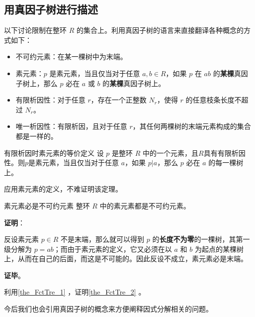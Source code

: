 

\subsection{用真因子树进行描述}

以下讨论限制在整环 $R$ 的集合上。利用真因子树的语言来直接翻译各种概念的方式如下：

\begin{definition}{}\label{def_FctTre_1}
\begin{itemize}
\item 不可约元素：在某一棵树中为末端。
\item 素元素：$p$ 是素元素，当且仅当对于任意 $a, b\in R$，如果 $p$ 在 $ab$ 的\textbf{某棵}真因子树上，那么 $p$ 必在 $a$ 或 $b$ 的\textbf{某棵}真因子树上。
\item 有限析因性：对于任意 $r$，存在一个正整数 $N_r$，使得 $r$ 的任意枝条长度不超过 $N_r$。
\item 唯一析因性：有限析因，且对于任意 $r$，其任何两棵树的末端元素构成的集合都是一样的。
\end{itemize}
\end{definition}

\begin{theorem}{有限析因时素元素的等价定义}\label{the_FctTre_1}
设 $p$ 是整环 $R$ 中的一个元素，且$R$具有有限析因性。则$p$是素元素，当且仅当对于任意 $a$，如果 $p|a$，那么 $p$ 必在 $a$ 的每一棵树上。
\end{theorem}

应用素元素的定义，不难证明该定理。


\begin{theorem}{素元素必是不可约元素}\label{the_FctTre_2}
整环 $R$ 中的素元素都是不可约元素。
\end{theorem}

\textbf{证明}：

反设素元素 $p\in R$ 不是末端，那么就可以得到 $p$ 的\textbf{长度不为零}的一棵树，其第一级分解为 $p=ab$；而由于素元素的定义，它又必须在以 $a$ 和 $b$ 为起点的某棵树上，从而在自己的后面，而这是不可能的。因此反设不成立，素元素必是末端。

\textbf{证毕}。

\begin{exercise}{}\label{exe_FctTre_1}
利用\autoref{the_FctTre_1} ，证明\autoref{the_FctTre_2} 。
\end{exercise}

今后我们也会引用真因子树的概念来方便阐释因式分解相关的问题。

